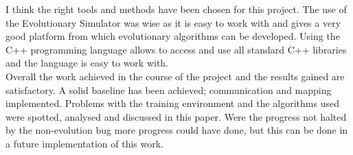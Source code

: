 I think the right tools and methods have been chosen for this project.
The use of the Evolutionary Simulator was wise as it is easy to work with and gives a very good platform from which evolutionary algorithms can be developed. 
Using the C++ programming language allows to access and use all standard C++ libraries and the language is easy to work with.\\

Overall the work achieved in the course of the project and the results gained are satisfactory. A solid baseline has been achieved; communication and mapping implemented. Problems with the training environment and the algorithms used were spotted, analysed and discussed in this paper. Were the progress not halted by the non-evolution bug more progress could have done, but this can be done in a future implementation of this work.\\


